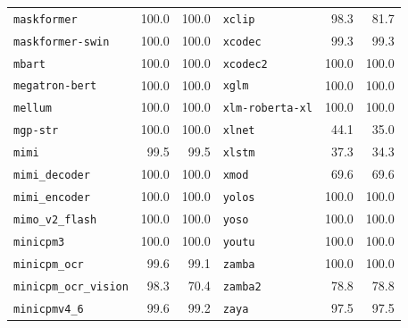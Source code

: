 \begin{longtable}{@{}lrr@{\hspace{24pt}}lrr@{}}
\texttt{maskformer} & 100.0 & 100.0 & \texttt{xclip} & 98.3 & 81.7 \\
\texttt{maskformer-swin} & 100.0 & 100.0 & \texttt{xcodec} & 99.3 & 99.3 \\
\texttt{mbart} & 100.0 & 100.0 & \texttt{xcodec2} & 100.0 & 100.0 \\
\texttt{megatron-bert} & 100.0 & 100.0 & \texttt{xglm} & 100.0 & 100.0 \\
\texttt{mellum} & 100.0 & 100.0 & \texttt{xlm-roberta-xl} & 100.0 & 100.0 \\
\texttt{mgp-str} & 100.0 & 100.0 & \texttt{xlnet} & 44.1 & 35.0 \\
\texttt{mimi} & 99.5 & 99.5 & \texttt{xlstm} & 37.3 & 34.3 \\
\texttt{mimi\_decoder} & 100.0 & 100.0 & \texttt{xmod} & 69.6 & 69.6 \\
\texttt{mimi\_encoder} & 100.0 & 100.0 & \texttt{yolos} & 100.0 & 100.0 \\
\texttt{mimo\_v2\_flash} & 100.0 & 100.0 & \texttt{yoso} & 100.0 & 100.0 \\
\texttt{minicpm3} & 100.0 & 100.0 & \texttt{youtu} & 100.0 & 100.0 \\
\texttt{minicpm\_ocr} & 99.6 & 99.1 & \texttt{zamba} & 100.0 & 100.0 \\
\texttt{minicpm\_ocr\_vision} & 98.3 & 70.4 & \texttt{zamba2} & 78.8 & 78.8 \\
\texttt{minicpmv4\_6} & 99.6 & 99.2 & \texttt{zaya} & 97.5 & 97.5 \\
\end{longtable}
